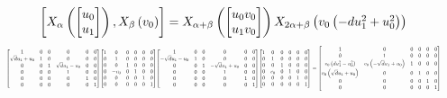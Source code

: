 \documentclass[11pt]{article}
\theoremstyle{definition}
\begin{document}
\[
\scaletoalign{\textwidth}{\left[ X_{\alpha}\left(\left[\begin{matrix}u_{0}\\u_{1}\end{matrix}\right]\right), X_{\beta}\left(v_{0}\right) \right] = X_{\alpha + \beta}\left(\left[\begin{matrix}u_{0} v_{0}\\u_{1} v_{0}\end{matrix}\right]\right) X_{2\alpha + \beta}\left(v_{0} \left(- d u_{1}^{2} + u_{0}^{2}\right)\right)}
\]
\[
\scaletoalign{\textwidth}{{\left[\begin{matrix}1 & 0 & 0 & 0 & 0 & 0\\\sqrt{d} u_{1} + u_{0} & 1 & 0 & 0 & 0 & 0\\0 & 0 & 1 & \sqrt{d} u_{1} - u_{0} & 0 & 0\\0 & 0 & 0 & 1 & 0 & 0\\0 & 0 & 0 & 0 & 1 & 0\\0 & 0 & 0 & 0 & 0 & 1\end{matrix}\right]} {\left[\begin{matrix}1 & 0 & 0 & 0 & 0 & 0\\0 & 1 & 0 & 0 & 0 & 0\\0 & 0 & 1 & 0 & 0 & 0\\0 & - v_{0} & 0 & 1 & 0 & 0\\0 & 0 & 0 & 0 & 1 & 0\\0 & 0 & 0 & 0 & 0 & 1\end{matrix}\right]} {\left[\begin{matrix}1 & 0 & 0 & 0 & 0 & 0\\- \sqrt{d} u_{1} - u_{0} & 1 & 0 & 0 & 0 & 0\\0 & 0 & 1 & - \sqrt{d} u_{1} + u_{0} & 0 & 0\\0 & 0 & 0 & 1 & 0 & 0\\0 & 0 & 0 & 0 & 1 & 0\\0 & 0 & 0 & 0 & 0 & 1\end{matrix}\right]} {\left[\begin{matrix}1 & 0 & 0 & 0 & 0 & 0\\0 & 1 & 0 & 0 & 0 & 0\\0 & 0 & 1 & 0 & 0 & 0\\0 & v_{0} & 0 & 1 & 0 & 0\\0 & 0 & 0 & 0 & 1 & 0\\0 & 0 & 0 & 0 & 0 & 1\end{matrix}\right]} = {\left[\begin{matrix}1 & 0 & 0 & 0 & 0 & 0\\0 & 1 & 0 & 0 & 0 & 0\\v_{0} \left(d u_{1}^{2} - u_{0}^{2}\right) & v_{0} \left(- \sqrt{d} u_{1} + u_{0}\right) & 1 & 0 & 0 & 0\\v_{0} \left(\sqrt{d} u_{1} + u_{0}\right) & 0 & 0 & 1 & 0 & 0\\0 & 0 & 0 & 0 & 1 & 0\\0 & 0 & 0 & 0 & 0 & 1\end{matrix}\right]}}
\]
\end{document}
